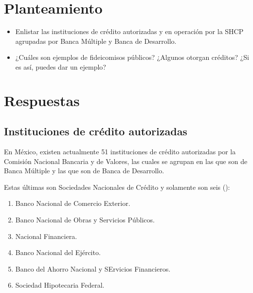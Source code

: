 \documentclass[preprint,floatfix] {revtex4}
\begin{document}
    
    \section{Planteamiento}
        \begin{itemize}
            \item Enlistar las instituciones de crédito autorizadas y en operación por la SHCP agrupadas por Banca Múltiple y Banca de Desarrollo.
            \item ¿Cuáles son ejemplos de fideicomisos públicos? ¿Algunos otorgan créditos? ¿Si es así, puedes dar un ejemplo?
        \end{itemize}
    \section{Respuestas}
        \subsection{Instituciones de crédito autorizadas}
            En México, existen actualmente 51 instituciones de crédito autorizadas por la Comisión Nacional Bancaria y de Valores, las cuales se agrupan en las que son de Banca Múltiple y las que son de Banca de Desarrollo. 
            
            Estas últimas son Sociedades Nacionales de Crédito y solamente son seis (\cite{cnbv-bd}):
            \begin{enumerate}
                \item Banco Nacional de Comercio Exterior.
                \item Banco Nacional de Obras y Servicios Públicos.
                \item Nacional Financiera.
                \item Banco Nacional del Ejército.
                \item Banco del Ahorro Nacional y SErvicios Financieros.
                \item Sociedad Hipotecaria Federal.
            \end{enumerate}
            
\end{document}
